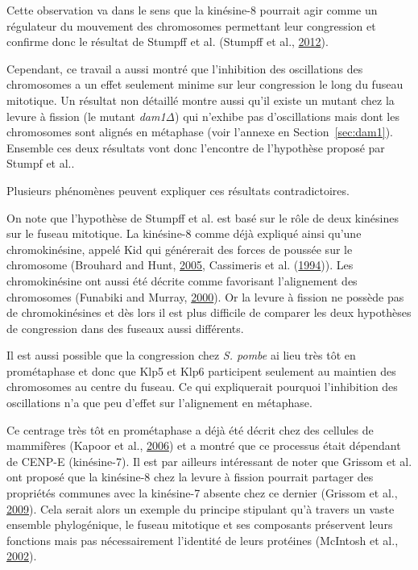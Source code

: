 \documentclass[12pt,a4paper,twoside,openright]{book}
\begin{document}
Cette observation va dans le sens que la kinésine-8 pourrait agir comme
un régulateur du mouvement des chromosomes permettant leur congression
et confirme donc le résultat de Stumpff et al. (Stumpff et al.,
\hyperref[ref-Stumpff2012]{2012}).

Cependant, ce travail a aussi montré que l'inhibition des oscillations
des chromosomes a un effet seulement minime sur leur congression le long
du fuseau mitotique. Un résultat non détaillé montre aussi qu'il existe
un mutant chez la levure à fission (le mutant \emph{dam1Δ}) qui n'exhibe
pas d'oscillations mais dont les chromosomes sont alignés en métaphase
(voir l'annexe en Section~\ref{sec:dam1}). Ensemble ces deux résultats
vont donc l'encontre de l'hypothèse proposé par Stumpf et al..

Plusieurs phénomènes peuvent expliquer ces résultats contradictoires.

On note que l'hypothèse de Stumpff et al. est basé sur le rôle de deux
kinésines sur le fuseau mitotique. La kinésine-8 comme déjà expliqué
ainsi qu'une chromokinésine, appelé Kid qui générerait des forces de
poussée sur le chromosome (Brouhard and Hunt,
\hyperref[ref-Brouhard2005]{2005}, Cassimeris et al.
(\hyperref[ref-Cassimeris1994]{1994})). Les chromokinésine ont aussi été
décrite comme favorisant l'alignement des chromosomes (Funabiki and
Murray, \hyperref[ref-Funabiki2000]{2000}). Or la levure à fission ne
possède pas de chromokinésines et dès lors il est plus difficile de
comparer les deux hypothèses de congression dans des fuseaux aussi
différents.

Il est aussi possible que la congression chez \emph{S. pombe} ai lieu
très tôt en prométaphase et donc que Klp5 et Klp6 participent seulement
au maintien des chromosomes au centre du fuseau. Ce qui expliquerait
pourquoi l'inhibition des oscillations n'a que peu d'effet sur
l'alignement en métaphase.

Ce centrage très tôt en prométaphase a déjà été décrit chez des cellules
de mammifères (Kapoor et al., \hyperref[ref-Kapoor2006]{2006}) et a
montré que ce processus était dépendant de CENP-E (kinésine-7). Il est
par ailleurs intéressant de noter que Grissom et al. ont proposé que la
kinésine-8 chez la levure à fission pourrait partager des propriétés
communes avec la kinésine-7 absente chez ce dernier (Grissom et al.,
\hyperref[ref-Grissom2009]{2009}). Cela serait alors un exemple du
principe stipulant qu'à travers un vaste ensemble phylogénique, le
fuseau mitotique et ses composants préservent leurs fonctions mais pas
nécessairement l'identité de leurs protéines (McIntosh et al.,
\hyperref[ref-McIntosh2002b]{2002}).
\end{document}

